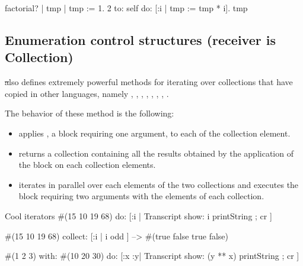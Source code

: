 \documentclass[a4paper,10pt,twoside]{book}
\begin{document}
\begin{script}{factorial?}
| tmp |
tmp := 1.
2 to: self do: [:i | tmp := tmp * i].
tmp
\end{script}

\subsection{Enumeration control structures (receiver is Collection)}
\st also defines extremely powerful methods for iterating over collections that have copied 
in other languages, namely  
  
  
, ,
, , , 
, , . 

The behavior of these method is the following: 
\begin{itemize}
\item {} applies , a block requiring one argument, to each of the collection element.

\item {} returns a collection containing all the results obtained by the application of the block  on each collection elements. 

\item {} iterates in parallel over each elements of the two collections and executes the block requiring two arguments with the elements of each collection. 
\end{itemize}

\begin{script}{Cool iterators}
#(15 10 19 68) do:  
   [:i | Transcript show: i printString ; cr ]

#(15 10 19 68) collect: [:i | i odd ]
   --> #(true false true false)

#(1 2 3) with: #(10 20 30) 
   do: [:x :y| Transcript show: (y ** x) printString ; cr ]
\end{script}
\end{document}
